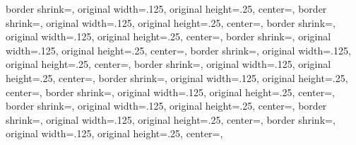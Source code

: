 {{}%
{%
	border shrink=\pgfpageoptionborder,%
	original width=.125\pgfpageoptionheight,%
	original height=.25\pgfpageoptionwidth,%
	center=\pgfpoint{.25\pgfphysicalwidth}{.75\pgfphysicalheight},%
}%
{%
	border shrink=\pgfpageoptionborder,%
	original width=.125\pgfpageoptionheight,%
	original height=.25\pgfpageoptionwidth,%
	center=\pgfpoint{.5\pgfphysicalwidth}{.75\pgfphysicalheight},%
}%
{
	border shrink=\pgfpageoptionborder,%
	original width=.125\pgfpageoptionheight,%
	original height=.25\pgfpageoptionwidth,%
	center=\pgfpoint{.75\pgfphysicalwidth}{.75\pgfphysicalheight},%
}%
%
%
%
{%
	border shrink=\pgfpageoptionborder,%
	original width=.125\pgfpageoptionheight,%
	original height=.25\pgfpageoptionwidth,%
	center=\pgfpoint{0pt}{.625\pgfphysicalheight},%
}%
{%
	border shrink=\pgfpageoptionborder,%
	original width=.125\pgfpageoptionheight,%
	original height=.25\pgfpageoptionwidth,%
	center=\pgfpoint{.25\pgfphysicalwidth}{.625\pgfphysicalheight},%
}%
{%
	border shrink=\pgfpageoptionborder,%
	original width=.125\pgfpageoptionheight,%
	original height=.25\pgfpageoptionwidth,%
	center=\pgfpoint{.5\pgfphysicalwidth}{.625\pgfphysicalheight},%
}%
{%
	border shrink=\pgfpageoptionborder,%
	original width=.125\pgfpageoptionheight,%
	original height=.25\pgfpageoptionwidth,%
	center=\pgfpoint{.75\pgfphysicalwidth}{.625\pgfphysicalheight},%
}%
%
%
%
%
{%
	border shrink=\pgfpageoptionborder,%
	original width=.125\pgfpageoptionheight,%
	original height=.25\pgfpageoptionwidth,%
	center=\pgfpoint{0pt}{.5\pgfphysicalheight},%
}%
{%
	border shrink=\pgfpageoptionborder,%
	original width=.125\pgfpageoptionheight,%
	original height=.25\pgfpageoptionwidth,%
	center=\pgfpoint{.25\pgfphysicalwidth}{.5\pgfphysicalheight},%
}%
{%
	border shrink=\pgfpageoptionborder,%
	original width=.125\pgfpageoptionheight,%
	original height=.25\pgfpageoptionwidth,%
	center=\pgfpoint{.5\pgfphysicalwidth}{.5\pgfphysicalheight},%
}%
{%
	border shrink=\pgfpageoptionborder,%
	original width=.125\pgfpageoptionheight,%
	original height=.25\pgfpageoptionwidth,%
	center=\pgfpoint{.75\pgfphysicalwidth}{.5\pgfphysicalheight},%
}%
%
%
%
}
